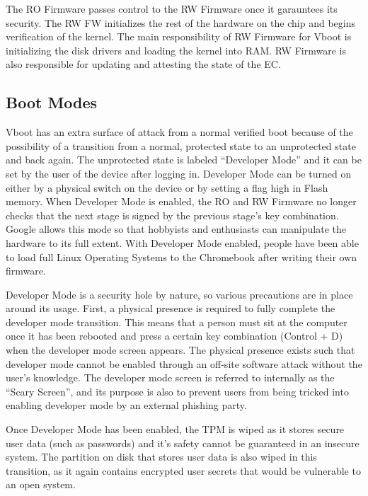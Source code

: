 The RO Firmware passes control to the RW Firmware once it garauntees its security.
The RW FW initializes the rest of the hardware on the chip and begins verification of the kernel.
The main responsibility of RW Firmware for Vboot is initializing the disk drivers and loading the kernel into RAM.
RW Firmware is also responsible for updating and attesting the state of the EC.

\subsection{Boot Modes}

Vboot has an extra surface of attack from a normal verified boot because of the possibility of a transition from a normal, protected state to an unprotected state and back again.
The unprotected state is labeled ``Developer Mode'' and it can be set by the user of the device after logging in. 
Developer Mode can be turned on either by a physical switch on the device or by setting a flag high in Flash memory.
When Developer Mode is enabled, the RO and RW Firmware no longer checks that the next stage is signed by the previous stage's key combination.
Google allows this mode so that hobbyists and enthusiasts can manipulate the hardware to its full extent.
With Developer Mode enabled, people have been able to load full Linux Operating Systems to the Chromebook after writing their own firmware.

Developer Mode is a security hole by nature, so various precautions are in place around its usage. 
First, a physical presence is required to fully complete the developer mode transition. 
This means that a person must sit at the computer once it has been rebooted and press a certain key combination (Control + D) when the developer mode screen appears.
The physical presence exists such that developer mode cannot be enabled through an off-site software attack without the user's knowledge.
The developer mode screen is referred to internally as the ``Scary Screen'', and its purpose is also to prevent users from being tricked into enabling developer mode by an external phishing party.

Once Developer Mode has been enabled, the TPM is wiped as it stores secure user data (such as passwords) and it's safety cannot be guaranteed in an insecure system.
The partition on disk that stores user data is also wiped in this transition, as it again contains encrypted user secrets that would be vulnerable to an open system.

